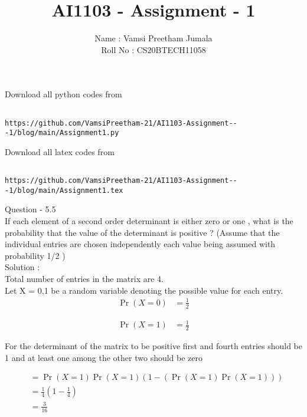 \documentclass[journal,12pt,twocolumn]{IEEEtran}
\title{AI1103 - Assignment - 1}
\author{Name : Vamsi Preetham Jumala \\Roll No : CS20BTECH11058}
\begin{document}
\maketitle


Download all python codes from\\


\begin{lstlisting}

https://github.com/VamsiPreetham-21/AI1103-Assignment---1/blog/main/Assignment1.py

\end{lstlisting}


Download all latex codes from\\



\begin{lstlisting}

https://github.com/VamsiPreetham-21/AI1103-Assignment---1/blog/main/Assignment1.tex
\end{lstlisting}



Question - 5.5\\


If each element of a second order determinant is either zero or one , what is the probability that the value of the determinant is positive ? (Assume that the individual entries are chosen independently each value being assumed with probability 1/2 )\\


Solution :\\

Total number of entries in the matrix are 4.\\
Let X = {0,1} be a random variable denoting the possible value for each entry.\\
\begin{equation}
\label{eq1}
\begin{split}
\Pr(X=0) & = \frac{1}{2}
\end{split}
\end{equation}

\begin{equation}
\label{eq2}
\begin{split}
\Pr(X=1) & = \frac{1}{2}
\end{split}
\end{equation}


For the determinant of the matrix to be positive first and fourth entries should be 1 and at least one among the other two should be zero

\begin{equation}
\begin{split}
&=\Pr(X=1)\Pr(X=1)(1-(\Pr(X=1)\Pr(X=1)))\\
&=\frac{1}{4}(1-\frac{1}{4})\\
&=\frac{3}{16}
\end{split}
\end{equation}
\end{document}
